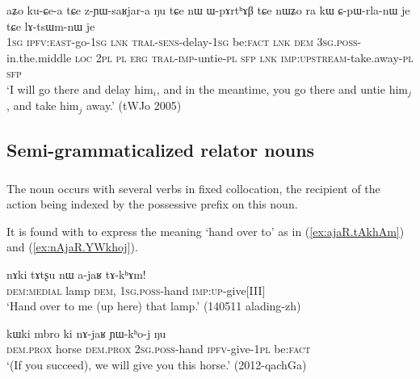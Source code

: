 \begin{exe}
\ex \label{ex:nW.WpArthAB.tCe}
\gll aʑo ku-ɕe-a tɕe z-ɲɯ-saʁjar-a ŋu tɕe nɯ ɯ-pɤrtʰɤβ tɕe nɯʑo ra kɯ ɕ-pɯ-rla-nɯ je tɕe lɤ-tsɯm-nɯ je \\
\textsc{1sg} \textsc{ipfv}:\textsc{east}-go-\textsc{1sg} \textsc{lnk} \textsc{tral}-\textsc{sens}-delay-\textsc{1sg} be:\textsc{fact} \textsc{lnk} \textsc{dem} \textsc{3sg}.\textsc{poss}-in.the.middle \textsc{loc} \textsc{2pl} \textsc{pl} \textsc{erg} \textsc{tral}-\textsc{imp}-untie-\textsc{pl} \textsc{sfp} \textsc{lnk} \textsc{imp}:\textsc{upstream}-take.away-\textsc{pl} \textsc{sfp} \\
\glt `I will go there and delay him$_i$, and in the meantime, you go there and untie him$_j$, and take him$_j$ away.' (tWJo 2005)
\end{exe}

\subsection{Semi-grammaticalized relator nouns} \label{sec:semi.grammaticalized.relator}

\subsubsection{} \label{sec:tWjaR}
The noun  occurs with several verbs in fixed collocation, the recipient of the action being indexed by the possessive prefix on this noun.

It is found with  to express the meaning `hand over to' as in (\ref{ex:ajaR.tAkhAm}) and (\ref{ex:nAjaR.YWkhoj}).

\begin{exe}
\ex \label{ex:ajaR.tAkhAm}
\gll nɤki tɤtʂu nɯ a-jaʁ tɤ-kʰɤm! \\
\textsc{dem}:\textsc{medial} lamp \textsc{dem}, \textsc{1sg}.\textsc{poss}-hand \textsc{imp}:\textsc{up}-give[III] \\
\glt `Hand over to me (up here) that lamp.' (140511 alading-zh)
\end{exe}

\begin{exe}
\ex \label{ex:nAjaR.YWkhoj}
\gll kɯki mbro ki nɤ-jaʁ ɲɯ-kʰo-j ŋu \\
\textsc{dem}.\textsc{prox} horse \textsc{dem}.\textsc{prox} \textsc{2sg}.\textsc{poss}-hand \textsc{ipfv}-give-\textsc{1pl} be:\textsc{fact} \\
\glt  `(If you succeed), we will give you this horse.'  (2012-qachGa)
\end{exe}

